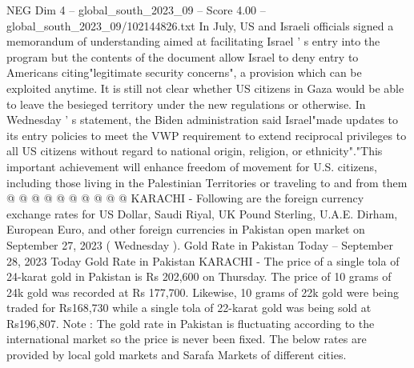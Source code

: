 \begin{textsample}{NEG Dim 4 – global\_south\_2023\_09 – Score 4.00 – global\_south\_2023\_09/102144826.txt}
In July, US and Israeli officials signed a memorandum of understanding aimed at facilitating Israel ' s entry into the program but the contents of the document allow Israel to deny entry to Americans citing"legitimate security concerns", a provision which can be exploited anytime.
It is still not clear whether US citizens in Gaza would be able to leave the besieged territory under the new regulations or otherwise.
In Wednesday ' s statement, the Biden administration said Israel"made updates to its entry policies to meet the VWP requirement to extend reciprocal privileges to all US citizens without regard to national origin, religion, or ethnicity"."This important achievement will enhance freedom of movement for U.S. citizens, including those living in the Palestinian Territories or traveling to and from them @ @ @ @ @ @ @ @ @ @ KARACHI - Following are the foreign currency exchange rates for US Dollar, Saudi Riyal, UK Pound Sterling, U.A.E.
Dirham, European Euro, and other foreign currencies in Pakistan open market on September 27, 2023 ( Wednesday ).
Gold Rate in Pakistan Today -- September 28, 2023 Today Gold Rate in Pakistan KARACHI - The price of a single tola of 24-karat gold in Pakistan is Rs 202,600 on Thursday.
The price of 10 grams of 24k gold was recorded at Rs 177,700.
Likewise, 10 grams of 22k gold were being traded for Rs168,730 while a single tola of 22-karat gold was being sold at Rs196,807.
Note : The gold rate in Pakistan is fluctuating according to the international market so the price is never been fixed.
The below rates are provided by local gold markets and Sarafa Markets of different cities.

\end{textsample}
